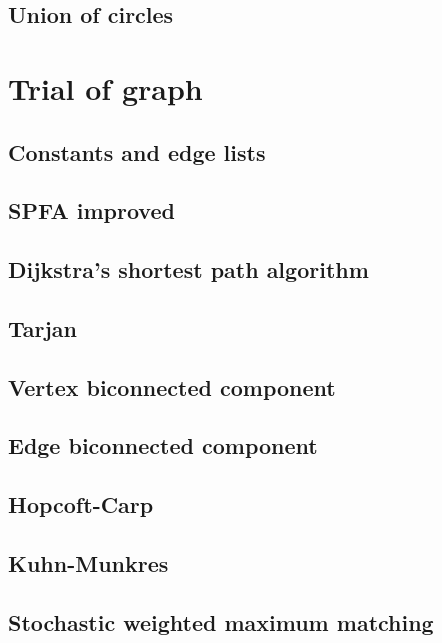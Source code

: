 \documentclass[UTF8,a4paper]{report}
\begin{document}
		\section{Union of circles}	
			
	\chapter{Trial of graph}
		\section{Constants and edge lists}
			
		\section{SPFA improved}
			
		\section{Dijkstra's shortest path algorithm}
			
		\section{Tarjan}
			
		\section{Vertex biconnected component}
			
		\section{Edge biconnected component}
			
		\section{Hopcoft-Carp}
			
		\section{Kuhn-Munkres}
			
		\section{Stochastic weighted maximum matching}
			
\end{document}
